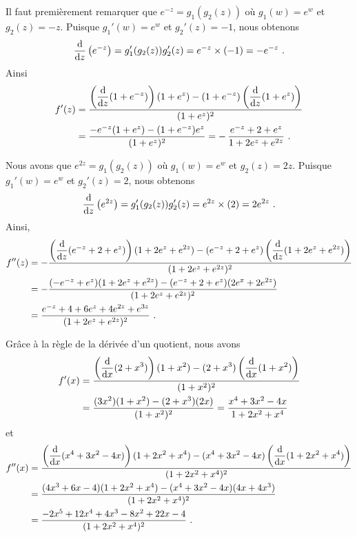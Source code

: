 {  Il faut premièrement remarquer que $e^{-z} = g_1(g_2(z))$ où
$g_1(w)=e^w$ et $g_2(z) = -z$.  Puisque $g_1'(w) = e^w$ et
$g_2'(z) = -1$, nous obtenons
\[
  \dfdx{\left( e^{-z} \right)}{z} = g_1'(g_2(z)) g_2'(z)
= e^{-z} \times (-1) = - e^{-z} \ .
\]
Ainsi
\begin{align*}
f'(z) &= \frac{\DS \left(\dfdx{(1+e^{-z})}{z}\right)
(1+e^z) -(1+e^{-z})\left(\dfdx{(1+e^z)}{z}\right)}{(1+e^z)^2} \\
&= \frac{-e^{-z}(1+e^z) -(1+e^{-z})e^z}{(1+e^z)^2}
= -\, \frac{e^{-z} +2 + e^z}{1+2 e^z + e^{2z}} \ .
\end{align*}

Nous avons que $e^{2z} = g_1(g_2(z))$ où $g_1(w)=e^w$ et $g_2(z) = 2z$.
Puisque $g_1'(w) = e^w$ et $g_2'(z) = 2$, nous obtenons
\[
  \dfdx{\left( e^{2z} \right)}{z} = g_1'(g_2(z)) g_2'(z)
= e^{2z} \times (2) = 2 e^{2z} \ .
\]
Ainsi,
\begin{align*}
f''(z) &= -\frac{\DS \left(\dfdx{(e^{-z}+2+e^z)}{z}\right)
(1+2e^z+e^{2z}) -(e^{-z} +2 + e^z)\left(\dfdx{(1+2e^z+e^{2z})}{z}\right)}
{(1+2e^z+e^{2z})^2} \\
&= -\frac{(-e^{-z} +e^z)(1+2e^z+e^{2z}) -(e^{-z}+2+e^z)(2e^x +2e^{2z})}
{(1+2e^z+e^{2z})^2} \\
&= \frac{e^{-z} +4 +6 e^z +4 e^{2z} + e^{3z}}{(1+2e^z+e^{2z})^2} \ .
\end{align*}

Grâce à la règle de la dérivée d'un quotient, nous avons
\begin{align*}
f'(x) &=
\frac{\DS \left(\dfdx{(2+x^3)}{x}\right)
(1+x^2) -(2+x^3)\left(\dfdx{(1+x^2)}{x}\right)}{(1+x^2)^2} \\
&= \frac{(3x^2)(1+x^2)-(2+x^3)(2x)}{(1+x^2)^2}
= \frac{x^4+3x^2-4x}{1+2x^2 +x^4}
\end{align*}
et
\begin{align*}
f''(x) &=
\frac{\DS \left(\dfdx{(x^4+3x^2-4x)}{x}\right)
(1+2x^2+x^4) -(x^4+3x^2-4x)\left(\dfdx{(1+2x^2+x^4)}{x}\right)}
{(1+2x^2+x^4)^2} \\
&= \frac{(4x^3+6x-4)(1+2x^2+x^4)-(x^4+3x^2-4x)(4x+4x^3)}{(1+2x^2+x^4)^2} \\
&= \frac{-2x^5+12x^4+4x^3-8x^2+22x-4}{(1+2x^2 +x^4)^2} \ .
\end{align*}
}


